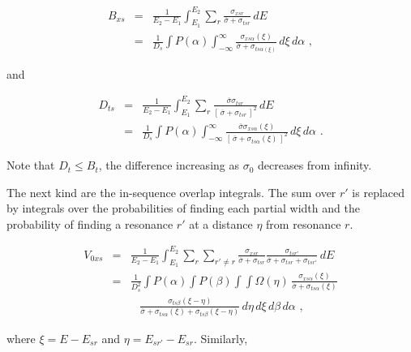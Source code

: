 \begin{eqnarray}
  B_{xs} &=& \frac{1}{E_2-E_1}\int_{E_1}^{E_2}\sum_r
    \frac{\sigma_{xsr}}{\overline{\sigma}+\sigma_{tsr}}\,dE \nonumber\\
  &=&\frac{1}{D_s}\int P(\alpha)\int_{-\infty}^\infty
    \frac{\sigma_{xs\alpha}(\xi)}{\overline{\sigma}+\sigma_{ts\alpha(\xi)}}
   \,d\xi\,d\alpha\,\,,
\end{eqnarray}

\noindent
and

\begin{eqnarray}
  D_{ts}&=&\frac{1}{E_2-E_1}\int_{E_1}^{E_2}\sum_r
    \frac{\overline{\sigma}\sigma_{tsr}}
       {[\,\overline{\sigma}+\sigma_{tsr}\,]^2}\,dE \nonumber\\
  &=&\frac{1}{D_s}\int P(\alpha)\int_{-\infty}^\infty
    \frac{\overline{\sigma}\sigma_{xs\alpha}(\xi)}
    {[\,\overline{\sigma}+\sigma_{ts\alpha}(\xi)\,]^2}
   \,d\xi\,d\alpha\,\,.
\end{eqnarray}

\noindent
Note that $D_t\le B_t$, the difference increasing as $\sigma_0$
decreases from infinity.

The next kind are the in-sequence overlap integrals.  The sum over $r'$ is
replaced by integrals over the probabilities of finding each partial width
and the probability of finding a resonance $r'$ at a distance $\eta$ from
resonance $r$.

\begin{eqnarray}
  V_{0xs} &=& \frac{1}{E_2-E_1}\int_{E_1}^{E_2}
     \sum_r\sum_{r'\neq r} \frac{\sigma_{xsr}}{\overline{\sigma}
       +\sigma_{tsr}}\frac{\sigma_{tsr'}}{\overline{\sigma}
       +\sigma_{tsr}+\sigma_{tsr'}}\,dE \nonumber\\
  &=& \frac{1}{D_s^2}\int P(\alpha)\int P(\beta)
         \int\int \Omega(\eta)\,\frac{\sigma_{xs\alpha}(\xi)}
           {\overline{\sigma}+\sigma_{ts\alpha}(\xi)} \nonumber\\
  & &\;\;\;\frac{\sigma_{ts\beta}(\xi-\eta)}
      {\overline{\sigma}+\sigma_{ts\alpha}(\xi)+\sigma_{ts\beta}(\xi-\eta)}
     \,d\eta\,d\xi\,d\beta\,d\alpha\,\,,
\end{eqnarray}

\noindent
where $\xi=E-E_{sr}$ and $\eta=E_{sr'}-E_{sr}$.  Similarly,

